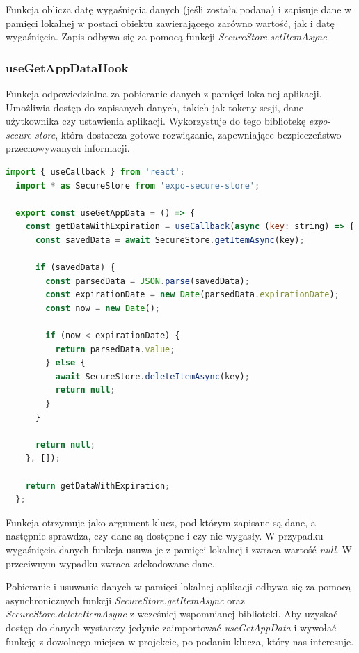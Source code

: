 Funkcja oblicza datę wygaśnięcia danych (jeśli została podana) i zapisuje dane w pamięci lokalnej w postaci obiektu zawierającego zarówno wartość, jak i datę wygaśnięcia. Zapis odbywa się za pomocą funkcji \textit{SecureStore.setItemAsync}.

\subsubsection{useGetAppDataHook}

Funkcja odpowiedzialna za pobieranie danych z pamięci lokalnej aplikacji. Umożliwia dostęp do zapisanych danych, takich jak tokeny sesji, dane użytkownika czy ustawienia aplikacji. Wykorzystuje do tego bibliotekę \textit{expo-secure-store}, która dostarcza gotowe rozwiązanie, zapewniające bezpieczeństwo przechowywanych informacji. 
    
\begin{lstlisting}[language=JavaScript, caption=useGetAppDataHook, label=lst:service]
  import { useCallback } from 'react';
  import * as SecureStore from 'expo-secure-store';
  
  export const useGetAppData = () => {
    const getDataWithExpiration = useCallback(async (key: string) => {
      const savedData = await SecureStore.getItemAsync(key);
  
      if (savedData) {
        const parsedData = JSON.parse(savedData);
        const expirationDate = new Date(parsedData.expirationDate);
        const now = new Date();
  
        if (now < expirationDate) {
          return parsedData.value;
        } else {
          await SecureStore.deleteItemAsync(key);
          return null;
        }
      }
  
      return null;
    }, []);
  
    return getDataWithExpiration;
  };      
\end{lstlisting}

Funkcja otrzymuje jako argument klucz, pod którym zapisane są dane, a następnie sprawdza, czy dane są dostępne i czy nie wygasły. W przypadku wygaśnięcia danych funkcja usuwa je z pamięci lokalnej i zwraca wartość \textit{null}. W przeciwnym wypadku zwraca zdekodowane dane. 

Pobieranie i usuwanie danych w pamięci lokalnej aplikacji odbywa się za pomocą asynchronicznych funkcji \textit{SecureStore.getItemAsync} oraz \textit{SecureStore.deleteItemAsync} z wcześniej wspomnianej biblioteki. Aby uzyskać dostęp do danych wystarczy jedynie zaimportować \textit{useGetAppData} i wywołać funkcję z dowolnego miejsca w projekcie, po podaniu klucza, który nas interesuje.

